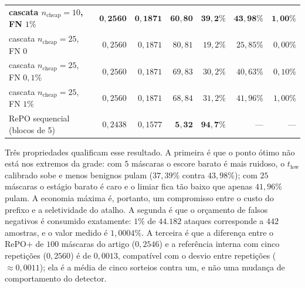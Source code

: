 \documentclass[conference]{IEEEtran}
\begin{document}
\begin{table}[!t]
\begin{tabular}{@{}lrrrrrr@{}}
\textbf{cascata $n_{\text{cheap}}=10$, FN $1\%$} & $\mathbf{0{,}2560}$ & $\mathbf{0{,}1871}$ & $\mathbf{60{,}80}$ & $\mathbf{39{,}2\%}$ & $\mathbf{43{,}98\%}$ & $\mathbf{1{,}00\%}$ \\
cascata $n_{\text{cheap}}=25$, FN $0$ & $0{,}2560$ & $0{,}1871$ & $80{,}81$ & $19{,}2\%$ & $25{,}85\%$ & $0{,}00\%$ \\
cascata $n_{\text{cheap}}=25$, FN $0{,}1\%$ & $0{,}2560$ & $0{,}1871$ & $69{,}83$ & $30{,}2\%$ & $40{,}63\%$ & $0{,}10\%$ \\
cascata $n_{\text{cheap}}=25$, FN $1\%$ & $0{,}2560$ & $0{,}1871$ & $68{,}84$ & $31{,}2\%$ & $41{,}96\%$ & $1{,}00\%$ \\
\midrule
RePO sequencial (blocos de 5) & $0{,}2438$ & $0{,}1577$ & $\mathbf{5{,}32}$ & $\mathbf{94{,}7\%}$ & --- & --- \\
\bottomrule
\end{tabular}
\end{table}

Três propriedades qualificam esse resultado.
A primeira é que o ponto ótimo não está nos extremos da grade: com $5$ máscaras o escore barato é mais ruidoso, o $t_{\text{low}}$ calibrado sobe e menos benignos pulam ($37{,}39\%$ contra $43{,}98\%$); com $25$ máscaras o estágio barato é caro e o limiar fica tão baixo que apenas $41{,}96\%$ pulam.
A economia máxima é, portanto, um compromisso entre o custo do prefixo e a seletividade do atalho.
A segunda é que o orçamento de falsos negativos é consumido exatamente: $1\%$ de $44.182$ ataques corresponde a $442$ amostras, e o valor medido é $1{,}0004\%$.
A terceira é que a diferença entre o RePO+ de $100$ máscaras do artigo ($0{,}2546$) e a referência interna com cinco repetições ($0{,}2560$) é de $0{,}0013$, compatível com o desvio entre repetições ($\approx 0{,}0011$); ela é a média de cinco sorteios contra um, e não uma mudança de comportamento do detector.
\end{document}
